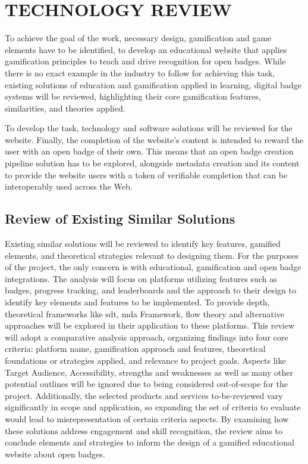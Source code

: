 \section{TECHNOLOGY REVIEW}

To achieve the goal of the work, necessary design, gamification and game elements have to be identified, to develop an educational website that applies gamification principles to teach and drive recognition for open badges. 
While there is no exact example in the industry to follow for achieving this task, existing solutions of education and gamification applied in learning, digital badge systems will be reviewed, highlighting their core gamification features, similarities, and theories applied.

To develop the task, technology and software solutions will be reviewed for the website. 
Finally, the completion of the website's content is intended to reward the user with an open badge of their own. 
This means that an open badge creation pipeline solution has to be explored, alongside metadata creation and its content to provide the website users with a token of verifiable completion that can be interoperably used across the Web.

\subsection{Review of Existing Similar Solutions}
Existing similar solutions will be reviewed to identify key features, gamified elements, and theoretical strategies relevant to designing them. For the purposes of the project, the only concern is with educational, gamification and open badge integrations. 
The analysis will focus on platforms utilizing features such as badges, progress tracking, and leaderboards and the approach to their design to identify key elements and features to be implemented. 
To provide depth, theoretical frameworks like \acrshort{sdt}, \acrshort{mda} Framework, flow theory and alternative approaches will be explored in their application to these platforms. 
This review will adopt a comparative analysis approach, organizing findings into four core criteria: platform name, gamification approach and features, theoretical foundations or strategies applied, and relevance to project goals. 
Aspects like Target Audience, Accessibility, strengths and weaknesses as well as many other potential outlines will be ignored due to being considered out-of-scope for the project. 
Additionally, the selected products and services to-be-reviewed vary significantly in scope and application, so expanding the set of criteria to evaluate would lead to misrepresentation of certain criteria aspects.
By examining how these solutions address engagement and skill recognition, the review aims to conclude elements and strategies to inform the design of a gamified educational website about open badges.

